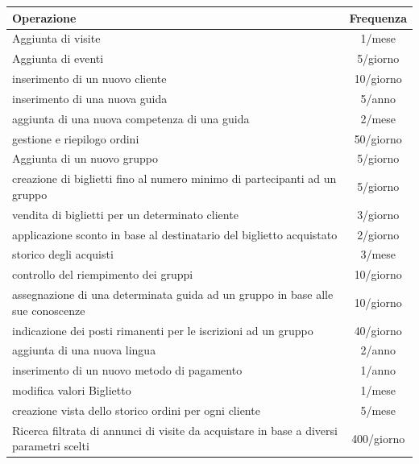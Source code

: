 \documentclass[a4paper,12pt]{report}
\begin{document}
\begin{tabularx}{\textwidth}{Xc}
    \toprule
    Operazione                                                                             & Frequenza  \\
    \toprule
    Aggiunta di visite                                                                     & 1/mese     \\
    Aggiunta di eventi                                                                     & 5/giorno   \\
    inserimento di un nuovo cliente                                                        & 10/giorno  \\
    inserimento di una nuova guida                                                         & 5/anno     \\
    aggiunta di una nuova competenza di una guida                                          & 2/mese     \\
    gestione e riepilogo ordini                                                            & 50/giorno  \\
    Aggiunta di un nuovo gruppo                                                            & 5/giorno   \\
    creazione di biglietti fino al numero minimo di partecipanti ad un gruppo              & 5/giorno   \\
    vendita di biglietti per un determinato cliente                                        & 3/giorno   \\
    applicazione sconto in base al destinatario del biglietto acquistato                   & 2/giorno   \\
    storico degli acquisti                                                                 & 3/mese     \\
    controllo del riempimento dei gruppi                                                   & 10/giorno  \\
    assegnazione di una determinata guida ad un gruppo in base alle sue conoscenze         & 10/giorno  \\
    indicazione dei posti rimanenti per le iscrizioni ad un gruppo                         & 40/giorno  \\
    aggiunta di una nuova lingua                                                           & 2/anno     \\
    inserimento di un nuovo metodo di pagamento                                            & 1/anno     \\
    modifica valori Biglietto                                                              & 1/mese     \\
    creazione vista dello storico ordini per ogni cliente                                  & 5/mese     \\
    Ricerca filtrata di annunci di visite da acquistare in base a diversi parametri scelti & 400/giorno \\
    \bottomrule
\end{tabularx}
\end{document}
